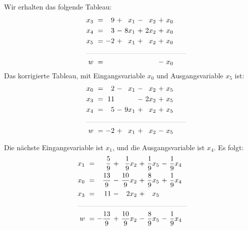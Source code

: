 \documentclass [a4paper,11pt]{article}
\begin{document}
\begin{enumerate}
\begin{enumerate}
            \newpage

            Wir erhalten das folgende Tableau:
            \begin{align*}
            \begin{alignedat}{6}
            && x_3 &\ = &\  9 &\ + &\  x_1 &\ - &\  x_2 &\ + &\ x_0 \\
            && x_4 &\ = &\  3 &\ - &\ 8x_1 &\ + &\ 2x_2 &\ + &\ x_0 \\
            && x_5 &\ = &\ -2 &\ + &\  x_1 &\ + &\  x_2 &\ + &\ x_0 \\
            &\rlap{\rule{5cm}{.1pt}} &&&&&&&&&\\
            && w   &\ = &     &    &       &    &       &\ - &\ x_0
            \end{alignedat}
            \end{align*}
            Das korrigierte Tableau, mit Eingangsvariable $x_0$ und Ausgangsvariable $x_5$ ist:
            \begin{align*}
            \begin{alignedat}{6}
            && x_0 &\ = &\  2 &\ - &\  x_1 &\ - &\  x_2 &\ + &\ x_5 \\
            && x_3 &\ = &\ 11 &    &       &\ - &\ 2x_2 &\ + &\ x_5 \\
            && x_4 &\ = &\  5 &\ - &\ 9x_1 &\ + &\  x_2 &\ + &\ x_5 \\
            &\rlap{\rule{5cm}{.1pt}} &&&&&&&&&\\
            && w   &\ = &\ -2 &\ + &\  x_1 &\ + &\  x_2 &\ - &\ x_5
            \end{alignedat}
            \end{align*}

            Die nächste Eingangsvariable ist $x_1$, und die Ausgangsvariable ist $x_4$. Es folgt:
            \begin{align*}
            \begin{alignedat}{6}
            && x_1 &\ = &\   \frac{5}{9} &\ + &\  \frac{1}{9}x_2 &\ + &\ \frac{1}{9}x_5 &\ - &\ \frac{1}{9}x_4 \\
            && x_0 &\ = &\  \frac{13}{9} &\ - &\ \frac{10}{9}x_2 &\ + &\ \frac{8}{9}x_5 &\ + &\ \frac{1}{9}x_4 \\
            && x_3 &\ = &\            11 &\ - &\            2x_2 &\ + &\            x_5 &    & \\
            &\rlap{\rule{5.5cm}{.1pt}} &&&&&&&&&\\
            && w   &\ = &\ -\frac{13}{9} &\ + &\ \frac{10}{9}x_2 &\ - &\ \frac{8}{9}x_5 &\ - &\ \frac{1}{9}x_4
            \end{alignedat}
            \end{align*}


\end{enumerate}
\end{enumerate}
\end{document}
